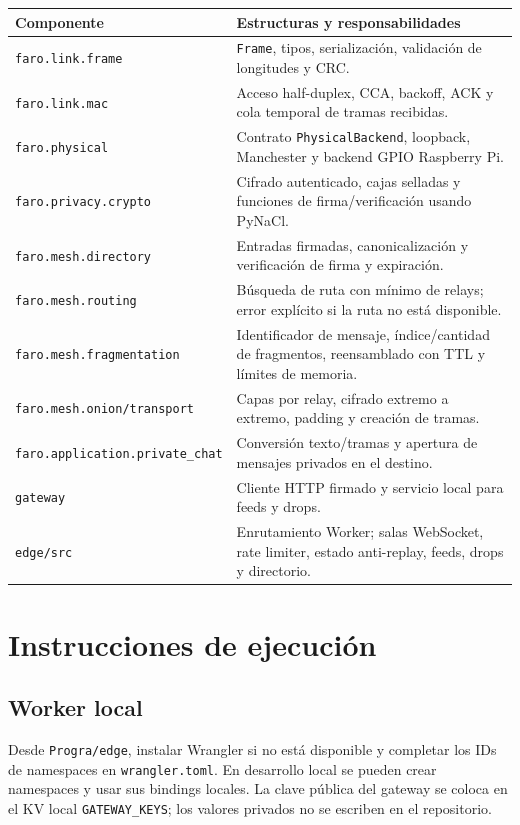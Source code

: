 \documentclass[12pt,a4paper]{article}
\begin{document}
\begin{longtable}{p{}p{}}
\toprule
\textbf{Componente} & \textbf{Estructuras y responsabilidades}\\
\midrule
\endhead
\texttt{faro.link.frame} & \texttt{Frame}, tipos, serialización, validación de longitudes y CRC.\\
\texttt{faro.link.mac} & Acceso half-duplex, CCA, backoff, ACK y cola temporal de tramas recibidas.\\
\texttt{faro.physical} & Contrato \texttt{PhysicalBackend}, loopback, Manchester y backend GPIO Raspberry Pi.\\
\texttt{faro.privacy.crypto} & Cifrado autenticado, cajas selladas y funciones de firma/verificación usando PyNaCl.\\
\texttt{faro.mesh.directory} & Entradas firmadas, canonicalización y verificación de firma y expiración.\\
\texttt{faro.mesh.routing} & Búsqueda de ruta con mínimo de relays; error explícito si la ruta no está disponible.\\
\texttt{faro.mesh.fragmentation} & Identificador de mensaje, índice/cantidad de fragmentos, reensamblado con TTL y límites de memoria.\\
\texttt{faro.mesh.onion/transport} & Capas por relay, cifrado extremo a extremo, padding y creación de tramas.\\
\texttt{faro.application.private\_chat} & Conversión texto/tramas y apertura de mensajes privados en el destino.\\
\texttt{gateway} & Cliente HTTP firmado y servicio local para feeds y drops.\\
\texttt{edge/src} & Enrutamiento Worker; salas WebSocket, rate limiter, estado anti-replay, feeds, drops y directorio.\\
\bottomrule
\end{longtable}

\section{Instrucciones de ejecución}

\subsection{Worker local}
Desde \texttt{Progra/edge}, instalar Wrangler si no está disponible y completar
los IDs de namespaces en \texttt{wrangler.toml}. En desarrollo local se
pueden crear namespaces y usar sus bindings locales. La clave pública del
gateway se coloca en el KV local \texttt{GATEWAY\_KEYS}; los valores privados
no se escriben en el repositorio.
\end{document}
